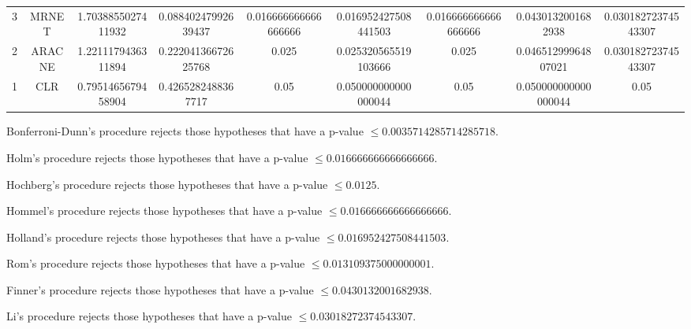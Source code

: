 \documentclass[a4paper,10pt]{article}
\begin{document}
\begin{landscape}
\begin{table}[!htp]
\begin{tabular}{ccccccccc}
3&MRNET&1.7038855027411932&0.08840247992639437&0.016666666666666666&0.016952427508441503&0.016666666666666666&0.0430132001682938&0.03018272374543307\\
2&ARACNE&1.2211179436311894&0.22204136672625768&0.025&0.025320565519103666&0.025&0.04651299964807021&0.03018272374543307\\
1&CLR&0.7951465679458904&0.4265282488367717&0.05&0.050000000000000044&0.05&0.050000000000000044&0.05\\
\hline
\end{tabular}
\end{table}
Bonferroni-Dunn's procedure rejects those hypotheses that have a p-value $\le0.0035714285714285718$.


Holm's procedure rejects those hypotheses that have a p-value $\le0.016666666666666666$.


Hochberg's procedure rejects those hypotheses that have a p-value $\le0.0125$.


Hommel's procedure rejects those hypotheses that have a p-value $\le0.016666666666666666$.


Holland's procedure rejects those hypotheses that have a p-value $\le0.016952427508441503$.


Rom's procedure rejects those hypotheses that have a p-value $\le0.013109375000000001$.


Finner's procedure rejects those hypotheses that have a p-value $\le0.0430132001682938$.


Li's procedure rejects those hypotheses that have a p-value $\le0.03018272374543307$.



\newpage


\end{landscape}
\end{document}
